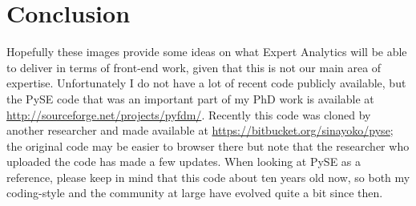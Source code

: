 \documentclass[11pt]{article}
\begin{document}
\section*{Conclusion}
Hopefully these images provide some ideas on what Expert Analytics will be able to deliver in terms of front-end work, given that this is not our main area of expertise. Unfortunately I do not have a lot of recent code publicly available, but the PySE code that was an important part of my PhD work is available at \url{http://sourceforge.net/projects/pyfdm/}. Recently this code was cloned by another researcher and made available at \url{https://bitbucket.org/sinayoko/pyse}; the original code may be easier to browser there but note that the researcher who uploaded the code has made a few updates. When looking at PySE as a reference, please keep in mind that this code about ten years old now, so both my coding-style and the community at large have evolved quite a bit since then.
 
\end{document}
